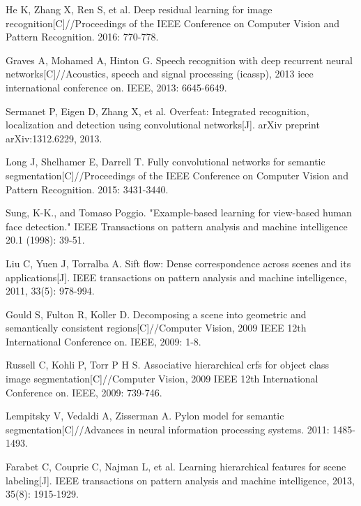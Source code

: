 \documentclass[10.5pt,compsoc]{TsT}
\theoremstyle{mystyle}
\begin{document}
\begin{thebibliography}{99}
 \addtolength{\itemsep}{-1em}
\vspace {1.5mm}


He K, Zhang X, Ren S, et al. Deep residual learning for image recognition[C]//Proceedings of the IEEE Conference on Computer Vision and Pattern Recognition. 2016: 770-778.

Graves A, Mohamed A, Hinton G. Speech recognition with deep recurrent neural networks[C]//Acoustics, speech and signal processing (icassp), 2013 ieee international conference on. IEEE, 2013: 6645-6649.

Sermanet P, Eigen D, Zhang X, et al. Overfeat: Integrated recognition, localization and detection using convolutional networks[J]. arXiv preprint arXiv:1312.6229, 2013.

Long J, Shelhamer E, Darrell T. Fully convolutional networks for semantic segmentation[C]//Proceedings of the IEEE Conference on Computer Vision and Pattern Recognition. 2015: 3431-3440.

Sung, K-K., and Tomaso Poggio. "Example-based learning for view-based human face detection." IEEE Transactions on pattern analysis and machine intelligence 20.1 (1998): 39-51.

Liu C, Yuen J, Torralba A. Sift flow: Dense correspondence across scenes and its applications[J]. IEEE transactions on pattern analysis and machine intelligence, 2011, 33(5): 978-994.

Gould S, Fulton R, Koller D. Decomposing a scene into geometric and semantically consistent regions[C]//Computer Vision, 2009 IEEE 12th International Conference on. IEEE, 2009: 1-8.

Russell C, Kohli P, Torr P H S. Associative hierarchical crfs for object class image segmentation[C]//Computer Vision, 2009 IEEE 12th International Conference on. IEEE, 2009: 739-746.


Lempitsky V, Vedaldi A, Zisserman A. Pylon model for semantic segmentation[C]//Advances in neural information processing systems. 2011: 1485-1493.

Farabet C, Couprie C, Najman L, et al. Learning hierarchical features for scene labeling[J]. IEEE transactions on pattern analysis and machine intelligence, 2013, 35(8): 1915-1929.


\end{thebibliography}
\end{document}
